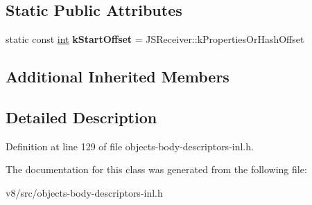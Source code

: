 \subsection*{Static Public Attributes}
\begin{DoxyCompactItemize}
\item 
\mbox{\label{classv8_1_1internal_1_1JSObject_1_1FastBodyDescriptor_aabf71e2193d057f13505becce42347d0}} 
static const \mbox{\hyperlink{classint}{int}} {\bfseries k\+Start\+Offset} = J\+S\+Receiver\+::k\+Properties\+Or\+Hash\+Offset
\end{DoxyCompactItemize}
\subsection*{Additional Inherited Members}


\subsection{Detailed Description}


Definition at line 129 of file objects-\/body-\/descriptors-\/inl.\+h.



The documentation for this class was generated from the following file\+:\begin{DoxyCompactItemize}
\item 
v8/src/objects-\/body-\/descriptors-\/inl.\+h\end{DoxyCompactItemize}
